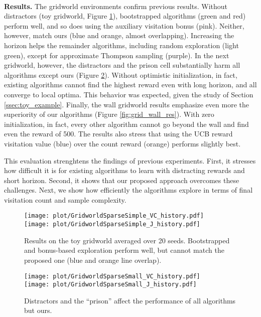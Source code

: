 \documentclass{article}
\begin{document}
\\[5pt]
\noindent
\textbf{Results.}
The gridworld environments confirm previous results. Without distractors (toy gridworld, Figure \ref{fig:grid_simple_res}), bootstrapped algorithms (green and red) perform well, and so does using the auxiliary visitation bonus (pink). Neither, however, match ours (blue and orange, almost overlapping). Increasing the horizon helps the remainder algorithms, including random exploration (light green), except for approximate Thompson sampling (purple).
In the next gridworld, however, the distractors and the prison cell substantially harm all algorithms except ours (Figure \ref{fig:grid_small_res}). Without optimistic initialization, in fact, existing algorithms cannot find the highest reward even with long horizon, and all converge to local optima. This behavior was expected, given the study of Section \ref{ssec:toy_example}. Finally, the wall gridworld results emphasize even more the superiority of our algorithms (Figure \ref{fig:grid_wall_res}). With zero initialization, in fact, every other algorithm cannot go beyond the wall and find even the reward of 500. The results also stress that using the UCB reward visitation value (blue) over the count reward (orange) performs slightly best.

This evaluation strenghtens the findings of previous experiments. First, it stresses how difficult it is for existing algorithms to learn with distracting rewards and short horizon. Second, it shows that our proposed approach overcomes these challenges. Next, we show how efficiently the algorithms explore in terms of final visitation count and sample complexity.


\clearpage

\begin{figure}
	\centering
	\texttt{[image: plot/GridworldSparseSimple\_VC\_history.pdf]}\\
	\texttt{[image: plot/GridworldSparseSimple\_J\_history.pdf]}
	\caption{\label{fig:grid_simple_res}Results on the toy gridworld averaged over 20 seeds. Bootstrapped and bonus-based exploration perform well, but cannot match the proposed one (blue and orange line overlap).}
\end{figure}


\begin{figure}
	\centering
	\texttt{[image: plot/GridworldSparseSmall\_VC\_history.pdf]}\\
	\texttt{[image: plot/GridworldSparseSmall\_J\_history.pdf]}
	\caption{\label{fig:grid_small_res}Distractors and the ``prison'' affect the performance of all algorithms but ours.}
\end{figure}
\end{document}
